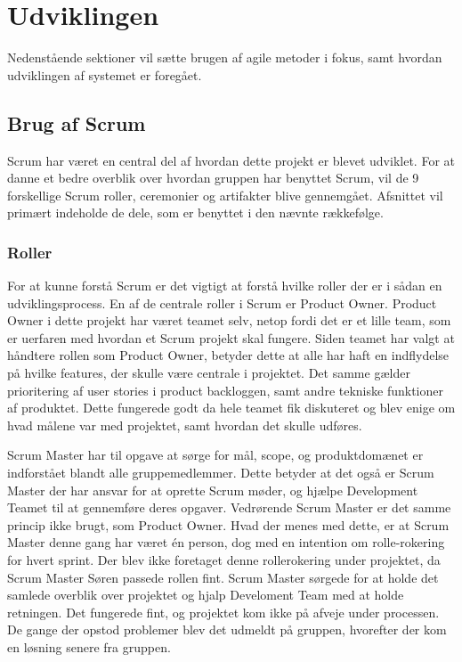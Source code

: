 \chapter{Udviklingen}\label{ch:Udviklingen}
Nedenstående sektioner vil sætte brugen af agile metoder i fokus, samt hvordan udviklingen af systemet er foregået.

\section{Brug af Scrum}
Scrum har været en central del af hvordan dette projekt er blevet udviklet.
For at danne et bedre overblik over hvordan gruppen har benyttet Scrum, vil de 9 forskellige Scrum roller, ceremonier og artifakter blive gennemgået. Afsnittet vil primært indeholde de dele, som er benyttet i den nævnte rækkefølge.

\subsection{Roller}
For at kunne forstå Scrum er det vigtigt at forstå hvilke roller der er i sådan en udviklingsprocess.\cite{ScrumTrenches}
En af de centrale roller i Scrum er Product Owner. 
Product Owner i dette projekt har været teamet selv, netop fordi det er et lille team, som er uerfaren med hvordan et Scrum projekt skal fungere. Siden teamet har valgt at håndtere rollen som Product Owner, betyder dette at alle har haft en indflydelse på hvilke features, der skulle være centrale i projektet. Det samme gælder prioritering af user stories i product backloggen, samt andre tekniske funktioner af produktet. Dette fungerede godt da hele teamet fik diskuteret og blev enige om hvad målene var med projektet, samt hvordan det skulle udføres. 

Scrum Master har til opgave at sørge for mål, scope, og produktdomænet er indforstået blandt alle gruppemedlemmer. Dette betyder at det også er Scrum Master der har ansvar for at oprette Scrum møder, og hjælpe Development Teamet til at gennemføre deres opgaver. 
Vedrørende Scrum Master er det samme princip ikke brugt, som Product Owner. Hvad der menes med dette, er at Scrum Master denne gang har været én person, dog med en intention om rolle-rokering for hvert sprint. Der blev ikke foretaget denne rollerokering under projektet, da Scrum Master Søren passede rollen fint. Scrum Master sørgede for at holde det samlede overblik over projektet og hjalp Develoment Team med at holde retningen. Det fungerede fint, og projektet kom ikke på afveje under processen. De gange der opstod problemer blev det udmeldt på gruppen, hvorefter der kom en løsning senere fra gruppen.

